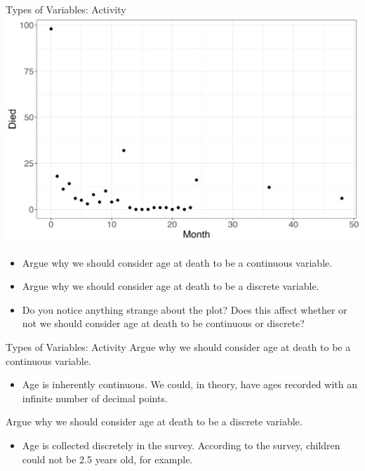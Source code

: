 \documentclass[
  ignorenonframetext,
]{beamer}
\providecommand{\tightlist}{%
  \setlength{\itemsep}{0pt}\setlength{\parskip}{0pt}}
\begin{document}
\begin{frame}{Types of Variables: Activity}
\protect\hypertarget{types-of-variables-activity-2}{}
\includegraphics{u5mr.png}

\begin{itemize}
\tightlist
\item
  Argue why we should consider age at death to be a continuous variable.
\item
  Argue why we should consider age at death to be a discrete variable.
\item
  Do you notice anything strange about the plot? Does this affect
  whether or not we should consider age at death to be continuous or
  discrete?
\end{itemize}
\end{frame}

\begin{frame}{Types of Variables: Activity}
\protect\hypertarget{types-of-variables-activity-3}{}
Argue why we should consider age at death to be a continuous variable.

\begin{itemize}
\tightlist
\item
  {Age} is inherently continuous. We could, in theory, have ages
  recorded with an infinite number of decimal points.
\end{itemize}

Argue why we should consider age at death to be a discrete variable.

\begin{itemize}
\tightlist
\item
  {Age} is collected discretely in the survey. According to the survey,
  children could not be 2.5 years old, for example.
\end{itemize}
\end{frame}
\end{document}
